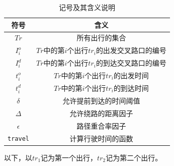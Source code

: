\begin{table}
\centering
\caption{记号及其含义说明}
\label{tab:notation}
\begin{tabular}{|c|c|}
\hline 
符号 & 含义\\
\hline 
\hline
$Tr$ & 所有出行的集合 \\
\hline 
$I_i^o$ & $Tr$中的第$i$个出行$tr_i$的出发交叉路口的编号\\
\hline 
$I_i^d$ & $Tr$中的第$i$个出行$tr_i$的到达交叉路口的编号\\
\hline 
$t_i^o$ & $Tr$中的第$i$个出行$tr_i$的出发时间\\
\hline 
$t_i^d$ & $Tr$中的第$i$个出行$tr_i$的到达时间\\
\hline 
$\delta$ & 允许提前到达的时间阈值\\
\hline
$\Delta$ & 允许绕路的距离因子\\
\hline 
$\epsilon$ & 路径重合率因子\\
\hline 
\texttt{travel} & 计算行驶时间的函数\\
\hline 
\end{tabular}
\end{table}
\par
以下，以$tr_1$记为第一个出行，$tr_2$记为第二个出行。
